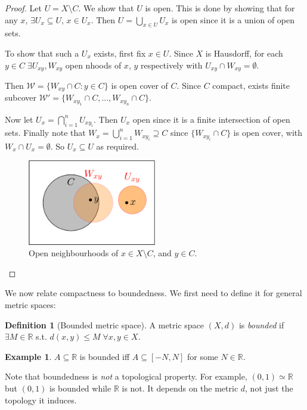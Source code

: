 \documentclass[a4paper,11pt]{article}
\theoremstyle{definition}
\newtheorem*{defn}{Definition}
\newtheorem*{ex}{Example}
\numberwithin{equation}{section}
\begin{document}
\begin{proof}
    Let $U=X\setminus C$. We show that $U$ is open. This is done by showing that for any $x$, $\exists U_x\subseteq U$, $x\in U_x$. Then $U=\bigcup_{x\in U} U_x$ is open since it is a union of open sets.
    
    To show that such a $U_x$ exists, first fix $x\in U$. Since $X$ is Hausdorff, for each $y\in C\;\exists U_{xy}, W_{xy}$ open nhoods of $x$, $y$ respectively with $U_{xy}\cap W_{xy}=\emptyset$.
    
    Then $\mathcal{W}=\{W_{xy}\cap C:y\in C\}$ is open cover of $C$. Since $C$ compact, exists finite subcover $\mathcal{W}'=\{W_{xy_1}\cap C,...,W_{xy_n}\cap C\}$.
    
    Now let $U_x=\bigcap_{i=1}^n U_{xy_i}$. Then $U_x$ open since it is a finite intersection of open sets. Finally note that $W_x=\bigcup_{i=1}^nW_{xy_i}\supseteq C$ since $\{W_{xy_i}\cap C\}$ is open cover, with $W_x\cap U_x=\emptyset$. So $U_x\subseteq U$ as required.
    
    \begin{figure}[t]
        \centering
        \includegraphics[width=0.5\textwidth]{fig1.PNG}
        \caption{Open neighbourhoods of $x\in X\setminus C$, and $y\in C$.}
        \label{fig:fig1}
    \end{figure}
\end{proof}

We now relate compactness to boundedness. We first need to define it for general metric spaces:
\begin{defn}[Bounded metric space]
    A metric space $(X,d)$ is \emph{bounded} if $\exists M\in\mathbb{R}$ s.t. $d(x,y)\leq M\;\forall x,y\in X$.
\end{defn}

\begin{ex}
$A\subseteq\mathbb{R}$ is bounded iff $A\subseteq[-N,N]$ for some $N\in\mathbb{R}$.
\end{ex}

Note that boundedness is \emph{not} a topological property. For example, $(0,1)\simeq\mathbb{R}$ but $(0,1)$ is bounded while $\mathbb{R}$ is not. It depends on the metric $d$, not just the topology it induces.
\end{document}
